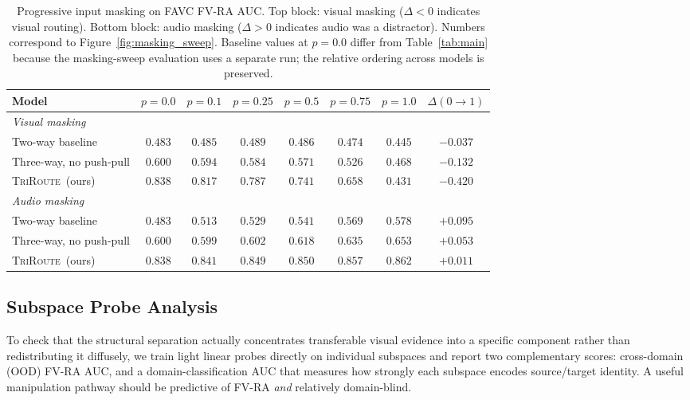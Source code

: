 \documentclass{article}
\newcommand{\method}{\textsc{TriRoute}}
\begin{document}
\begin{table}[t]
    \centering
    \caption{Progressive input masking on FAVC FV-RA AUC. Top block: visual masking ($\Delta < 0$ indicates visual routing). Bottom block: audio masking ($\Delta > 0$ indicates audio was a distractor). Numbers correspond to Figure~\ref{fig:masking_sweep}. Baseline values at $p{=}0.0$ differ from Table~\ref{tab:main} because the masking-sweep evaluation uses a separate run; the relative ordering across models is preserved.}
    \label{tab:masking_sweep}
    \small
    \begin{tabular}{lccccccc}
        \toprule
        Model & $p{=}0.0$ & $p{=}0.1$ & $p{=}0.25$ & $p{=}0.5$ & $p{=}0.75$ & $p{=}1.0$ & $\Delta(0{\rightarrow}1)$ \\
        \midrule
        \multicolumn{8}{l}{\emph{Visual masking}} \\
        Two-way baseline        & $0.483$ & $0.485$ & $0.489$ & $0.486$ & $0.474$ & $0.445$ & $-0.037$ \\
        Three-way, no push-pull & $0.600$ & $0.594$ & $0.584$ & $0.571$ & $0.526$ & $0.468$ & $-0.132$ \\
        \method\ (ours)         & $0.838$ & $0.817$ & $0.787$ & $0.741$ & $0.658$ & $0.431$ & $\mathbf{-0.420}$ \\
        \midrule
        \multicolumn{8}{l}{\emph{Audio masking}} \\
        Two-way baseline        & $0.483$ & $0.513$ & $0.529$ & $0.541$ & $0.569$ & $0.578$ & $\mathbf{+0.095}$ \\
        Three-way, no push-pull & $0.600$ & $0.599$ & $0.602$ & $0.618$ & $0.635$ & $0.653$ & $+0.053$ \\
        \method\ (ours)         & $0.838$ & $0.841$ & $0.849$ & $0.850$ & $0.857$ & $0.862$ & $+0.011$ \\
        \bottomrule
    \end{tabular}
\end{table}

\subsection{Subspace Probe Analysis}

To check that the structural separation actually concentrates transferable visual evidence into a specific component rather than redistributing it diffusely, we train light linear probes directly on individual subspaces and report two complementary scores: cross-domain (OOD) FV-RA AUC, and a domain-classification AUC that measures how strongly each subspace encodes source/target identity. A useful manipulation pathway should be predictive of FV-RA \emph{and} relatively domain-blind.
\end{document}
